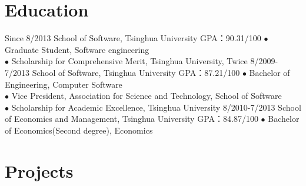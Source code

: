 \documentclass[]{friggeri-cv}
\begin{document}

\section{Education}

\begin{entrylist}
  \entry
    {Since 8/2013}
    {School of Software, Tsinghua University}
    {GPA：90.31/100}
    {$\bullet$ Graduate Student, Software engineering \\
    $\bullet$ Scholarship for Comprehensive Merit, Tsinghua University, Twice
    }
  \entry
    {8/2009-7/2013}
    {School of Software, Tsinghua University}
    {GPA：87.21/100}
    {$\bullet$ Bachelor of Engineering, Computer Software \\
    $\bullet$ Vice President, Association for Science and Technology, School of Software\\
    $\bullet$ Scholarship for Academic Excellence, Tsinghua University
    }
  \entry
    {8/2010-7/2013}
    {School of Economics and Management, Tsinghua University}
    {GPA：84.87/100}
    {$\bullet$ Bachelor of Economics(Second degree), Economics}
\end{entrylist}

\section{Projects}
\end{document}
